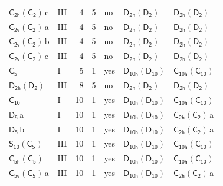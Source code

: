 \documentclass[10pt,a4paper]{article}
\numberwithin{equation}{section}
\newcommand{\grp}[1]{\mathsf{#1}}
\newcommand{\clsletter}[1]{\,{\scriptsize\color{black!55}#1}}
\begin{document}
{\begin{longtable}{@{}llrrlll@{}}
\href{C2h-C2.pdf}{$\grp{C_{2h}}(\grp{C_{2}})$}\clsletter{c} & III & 4 & 5 & no & \href{D2h-D2.pdf}{$\grp{D_{2h}}(\grp{D_{2}})$} & \href{D2h-D2.pdf}{$\grp{D_{2h}}(\grp{D_{2}})$}\\
\href{C2v-C2.pdf}{$\grp{C_{2v}}(\grp{C_{2}})$}\clsletter{a} & III & 4 & 5 & no & \href{D2h-D2.pdf}{$\grp{D_{2h}}(\grp{D_{2}})$} & \href{D2h-D2.pdf}{$\grp{D_{2h}}(\grp{D_{2}})$}\\
\href{C2v-C2.pdf}{$\grp{C_{2v}}(\grp{C_{2}})$}\clsletter{b} & III & 4 & 5 & no & \href{D2h-D2.pdf}{$\grp{D_{2h}}(\grp{D_{2}})$} & \href{D2h-D2.pdf}{$\grp{D_{2h}}(\grp{D_{2}})$}\\
\href{C2v-C2.pdf}{$\grp{C_{2v}}(\grp{C_{2}})$}\clsletter{c} & III & 4 & 5 & no & \href{D2h-D2.pdf}{$\grp{D_{2h}}(\grp{D_{2}})$} & \href{D2h-D2.pdf}{$\grp{D_{2h}}(\grp{D_{2}})$}\\
\href{../../../rotation/data/pdf/C5.pdf}{$\grp{C_{5}}$} & I & 5 & 1 & yes & \href{D10h-D10.pdf}{$\grp{D_{10h}}(\grp{D_{10}})$} & \href{C10h-C10.pdf}{$\grp{C_{10h}}(\grp{C_{10}})$}\\
\href{D2h-D2.pdf}{$\grp{D_{2h}}(\grp{D_{2}})$} & III & 8 & 5 & no & \href{D2h-D2.pdf}{$\grp{D_{2h}}(\grp{D_{2}})$} & \href{D2h-D2.pdf}{$\grp{D_{2h}}(\grp{D_{2}})$}\\
\href{../../../rotation/data/pdf/C10.pdf}{$\grp{C_{10}}$} & I & 10 & 1 & yes & \href{D10h-D10.pdf}{$\grp{D_{10h}}(\grp{D_{10}})$} & \href{C10h-C10.pdf}{$\grp{C_{10h}}(\grp{C_{10}})$}\\
\href{../../../rotation/data/pdf/D5.pdf}{$\grp{D_{5}}$}\clsletter{a} & I & 10 & 1 & yes & \href{D10h-D10.pdf}{$\grp{D_{10h}}(\grp{D_{10}})$} & \href{C2h-C2.pdf}{$\grp{C_{2h}}(\grp{C_{2}})$}\clsletter{a}\\
\href{../../../rotation/data/pdf/D5.pdf}{$\grp{D_{5}}$}\clsletter{b} & I & 10 & 1 & yes & \href{D10h-D10.pdf}{$\grp{D_{10h}}(\grp{D_{10}})$} & \href{C2h-C2.pdf}{$\grp{C_{2h}}(\grp{C_{2}})$}\clsletter{a}\\
\href{S10-C5.pdf}{$\grp{S_{10}}(\grp{C_{5}})$} & III & 10 & 1 & yes & \href{D10h-D10.pdf}{$\grp{D_{10h}}(\grp{D_{10}})$} & \href{C10h-C10.pdf}{$\grp{C_{10h}}(\grp{C_{10}})$}\\
\href{C5h-C5.pdf}{$\grp{C_{5h}}(\grp{C_{5}})$} & III & 10 & 1 & yes & \href{D10h-D10.pdf}{$\grp{D_{10h}}(\grp{D_{10}})$} & \href{C10h-C10.pdf}{$\grp{C_{10h}}(\grp{C_{10}})$}\\
\href{C5v-C5.pdf}{$\grp{C_{5v}}(\grp{C_{5}})$}\clsletter{a} & III & 10 & 1 & yes & \href{D10h-D10.pdf}{$\grp{D_{10h}}(\grp{D_{10}})$} & \href{C2h-C2.pdf}{$\grp{C_{2h}}(\grp{C_{2}})$}\clsletter{a}\\

\end{longtable}}
\end{document}
